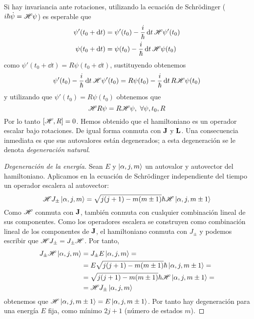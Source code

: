 Si hay invariancia ante rotaciones, utilizando la ecuación de
Schrödinger ($i \hbar \dot{\psi} =  \mathscr{H} \psi$) es esperable que
\begin{equation}
  \begin{split}
    \psi'(t_0 + \dd{t}) &= \psi'(t_0) - \frac{i}{\hbar} \dd{t}
     \mathscr{H}  \psi'(t_0) \\
    \psi(t_0 + \dd{t}) &= \psi(t_0) - \frac{i}{\hbar} \dd{t}  \mathscr{H}  \psi(t_0)
  \end{split}
\end{equation}
como $\psi'(t_0 + \dd{t}) = R \psi(t_0 + \dd{t})$, sustituyendo
obtenemos
\begin{equation}
  \psi'(t_0)-\frac{i}{\hbar}\dd{t} \mathscr{H} \psi'(t_0) = R \psi (t_0)
  - \frac{i}{\hbar}\dd{t}R  \mathscr{H}  \psi(t_0)
\end{equation}
y utilizando que $\psi'(t_0) = R \psi(t_0)$ obtenemos que
\begin{equation}
   \Ham R\psi = R  \Ham  \psi, \ \forall \psi,t_0,R
\end{equation}
Por lo tanto $[ \mathscr{H} ,R] = 0$. Hemos obtenido que el hamiltoniano
es un operador escalar bajo rotaciones. De igual forma conmuta con
$\bm{\mathrm{J}}$ y $\bm{\mathrm{L}}$. Una consecuencia inmediata es que sus
autovalores están degenerados; a esta degeneración se le denota
\emph{degeneración natural}. 

\begin{proof}[Degeneración de la energía]
  Sean $E$ y $\ket{\alpha,j,m}$ un autovalor y autovector del
  hamiltoniano. Aplicamos en la ecuación de Schrödinger independiente
  del tiempo un operador escalera al autovector:
  \begin{equation}
     \mathscr{H}  J_\pm \ket{\alpha,j,m} = \sqrt{j(j+1) - m(m\pm 1)}
    \hbar  \mathscr{H}  \ket{\alpha,j,m\pm1}
  \end{equation}
  Como $ \mathscr{H} $ conmuta con $\bm{\mathrm{J}}$, también conmuta con
  cualquier combinación lineal de sus componentes. Como los operadores
  escalera se construyen como combinación lineal de los componentes de
  $\bm{\mathrm{J}}$, el hamiltoniano conmuta con $J_\pm$ y podemos escribir
  que $ \mathscr{H} J_\pm = J_\pm  \mathscr{H} $. Por tanto,
  \begin{equation}
    \begin{split}
      J_\pm \mathscr{H}  \ket{\alpha,j,m} &= J_\pm E \ket{\alpha,j,m} =
      \\ &= E
      \sqrt{j(j+1) - m(m\pm 1)} \hbar \ket{\alpha,j,m\pm1} = \\
      &= \sqrt{j(j+1) - m(m\pm 1)}
    \hbar  \mathscr{H}  \ket{\alpha,j,m\pm1} =\\ &=  \mathscr{H} J_\pm \ket{\alpha,j,m}
    \end{split}
  \end{equation}
  obtenemos que $ \mathscr{H} \ket{\alpha,j,m\pm1} = E
  \ket{\alpha,j,m\pm1}$. Por tanto hay degeneración para una energía
  $E$ fija, como mínimo $2j+1$ (número de estados $m$).
\end{proof}

